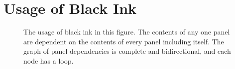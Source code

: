 \chapter{Usage of Black Ink} \label{app:ink}

\begin{figure}[hp]
\centering
{}
\caption[Black ink usage]{
    The usage of black ink in this figure.
    The contents of any one panel are dependent
    on the contents of every panel including itself.
    The graph of panel dependencies is complete and bidirectional,
    and each node has a loop.
}
\label{fig:black-ink}
\end{figure}

